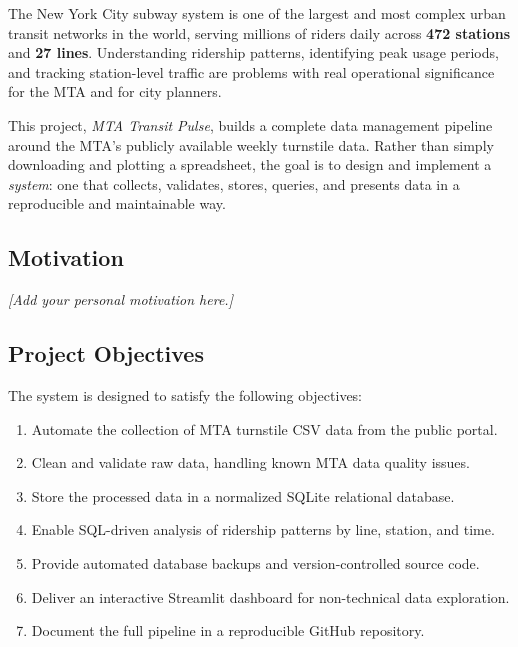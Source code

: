 
The New York City subway system is one of the largest and most complex urban
transit networks in the world, serving millions of riders daily across
\textbf{472 stations} and \textbf{27 lines}. Understanding ridership patterns,
identifying peak usage periods, and tracking station-level traffic are problems
with real operational significance for the MTA and for city planners.

This project, \textit{MTA Transit Pulse}, builds a complete data management pipeline
around the MTA's publicly available weekly turnstile data. Rather than simply
downloading and plotting a spreadsheet, the goal is to design and implement a
\textit{system}: one that collects, validates, stores, queries, and presents data
in a reproducible and maintainable way.

\subsection{Motivation}

\textit{[Add your personal motivation here.]}

\subsection{Project Objectives}

The system is designed to satisfy the following objectives:

\begin{enumerate}
    \item Automate the collection of MTA turnstile CSV data from the public portal.
    \item Clean and validate raw data, handling known MTA data quality issues.
    \item Store the processed data in a normalized SQLite relational database.
    \item Enable SQL-driven analysis of ridership patterns by line, station, and time.
    \item Provide automated database backups and version-controlled source code.
    \item Deliver an interactive Streamlit dashboard for non-technical data exploration.
    \item Document the full pipeline in a reproducible GitHub repository.
\end{enumerate}

